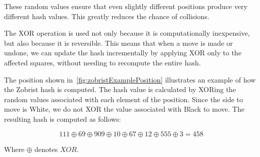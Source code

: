 \noindent These random values ensure that even slightly different positions produce very different hash values. This greatly reduces the chance of collisions.

\vspace{1em}

\noindent The XOR operation is used not only because it is computationally inexpensive, but also because it is reversible. This means that when a move is made or undone, we can update the hash incrementally by applying XOR only to the affected squares, without needing to recompute the entire hash.

\vspace{1em}

\noindent The position shown in~\cref{fig:zobristExamplePosition} illustrates an example of how the Zobrist hash is computed.  
The hash value is calculated by XORing the random values associated with each element of the position.  
Since the side to move is White, we do not XOR the value associated with Black to move.  
The resulting hash is computed as follows:

\[
111 \oplus 69 \oplus 909 \oplus 10 \oplus 67 \oplus 12 \oplus 555 \oplus 3 = 458
\]

\noindent Where $\oplus$ denotes $XOR$.

